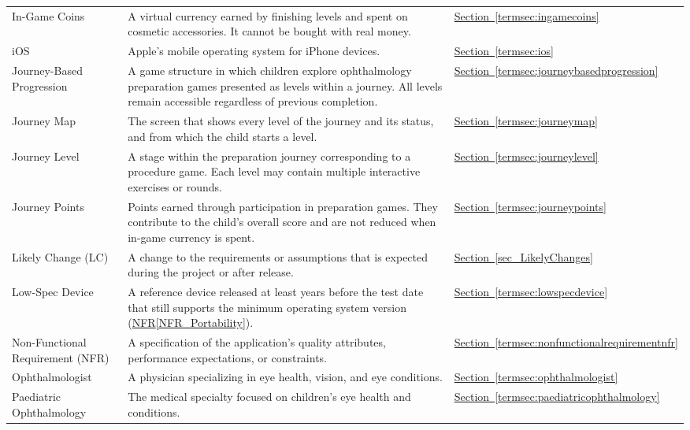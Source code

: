 \documentclass[10pt]{article}
\newcommand{\termloc}[1]{\hyperlink{term:#1}{Section~\ref*{termsec:#1}}}
\newcommand{\termlocref}[1]{\hyperref[#1]{Section~\ref*{#1}}}
\newcommand{\nfrref}[1]{\hyperref[#1]{NFR\ref*{#1}}}
\newcommand{\constref}[1]{%
    \hyperref[const:#1]{\texttt{\detokenize{#1}}}%
}
\begin{document}
\begin{longtable}{@{}p{} p{} p{}@{}}
In-Game Coins &
A virtual currency earned by finishing levels and spent on cosmetic accessories. It cannot be bought with real money. &
\termloc{ingamecoins} \\

iOS &
Apple's mobile operating system for iPhone devices. &
\termloc{ios} \\

Journey-Based Progression &
A game structure in which children explore ophthalmology preparation games presented as levels within a journey. All levels remain accessible regardless of previous completion. &
\termloc{journeybasedprogression} \\

Journey Map &
The screen that shows every level of the journey and its status, and from which the child starts a level. &
\termloc{journeymap} \\

Journey Level &
A stage within the preparation journey corresponding to a procedure game. Each level may contain multiple interactive exercises or rounds. &
\termloc{journeylevel} \\

Journey Points &
Points earned through participation in preparation games. They contribute to the child's overall score and are not reduced when in-game currency is spent. &
\termloc{journeypoints} \\

Likely Change (LC) &
A change to the requirements or assumptions that is expected during the project or after release. &
\termlocref{sec_LikelyChanges} \\

Low-Spec Device &
A reference device released at least \constref{LOW_SPEC_AGE_YEARS} years before the test date that still supports the minimum operating system version (\nfrref{NFR_Portability}). &
\termloc{lowspecdevice} \\

Non-Functional Requirement (NFR) &
A specification of the application's quality attributes, performance expectations, or constraints. &
\termloc{nonfunctionalrequirementnfr} \\

Ophthalmologist &
A physician specializing in eye health, vision, and eye conditions. &
\termloc{ophthalmologist} \\

Paediatric Ophthalmology &
The medical specialty focused on children's eye health and conditions. &
\termloc{paediatricophthalmology} \\


\end{longtable}
\end{document}
